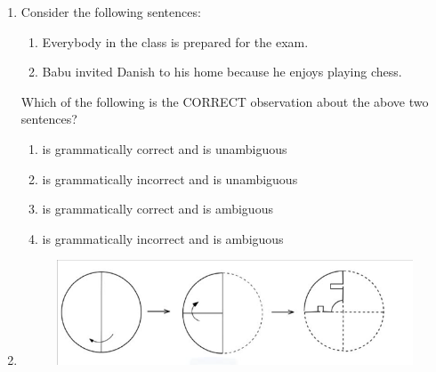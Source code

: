 \documentclass[a4paper, 11pt]{article}
\begin{document}
\begin{enumerate}
    \item Consider the following sentences:
    \begin{enumerate}[label=(\roman*)]
    \centering
        \item Everybody in the class is prepared for the exam.
        \item Babu invited Danish to his home because he enjoys playing chess.
    \end{enumerate}
    Which of the following is the CORRECT observation about the above two sentences?
    \begin{enumerate}
        \item {} is grammatically correct and  is unambiguous
        \item {} is grammatically incorrect and  is unambiguous
        \item {} is grammatically correct and  is ambiguous
        \item {} is grammatically incorrect and  is ambiguous
    \end{enumerate}
    \hfill{}

    \item 
    \begin{figure}[h]
        \centering
        \includegraphics[width=0.8\columnwidth]{figs/q4.png}
        \label{fig:q4}
    \end{figure}
    

\end{enumerate}
\end{document}
